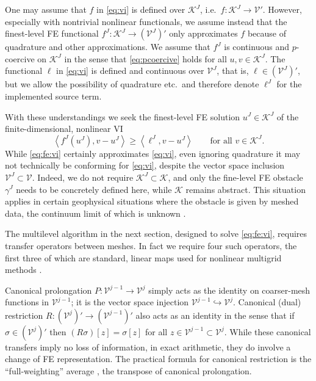 \documentclass[letterpaper,final,12pt,reqno]{amsart}
\theoremstyle{cstyle}
\theoremstyle{cstyle*}
\theoremstyle{dstyle}
\numberwithin{equation}{section}
\numberwithin{figure}{section}
\numberwithin{table}{section}
\numberwithin{theorem}{section}
\newcommand{\cK}{\mathcal{K}}
\newcommand{\ip}[2]{\left<#1,#2\right>}
\begin{document}
One may assume that $f$ in \eqref{eq:vi} is defined over $\mathcal{K}^J$, i.e.~$f:\mathcal{K}^J \to \mathcal{V}'$.  However, especially with nontrivial nonlinear functionals, we assume instead that the finest-level FE functional $f^J:\mathcal{K}^J \to (\mathcal{V}^J)'$ only approximates $f$ because of quadrature and other approximations.  We assume that $f^J$ is continuous and $p$-coercive on $\mathcal{K}^J$ in the sense that \eqref{eq:pcoercive} holds for all $u,v \in \mathcal{K}^J$.  The functional $\ell$ in \eqref{eq:vi} is defined and continuous over $\mathcal{V}^J$, that is, $\ell\in (\mathcal{V}^J)'$, but we allow the possibility of quadrature etc.~and therefore denote $\ell^J$ for the implemented source term.

With these understandings we seek the finest-level FE solution $u^J \in \mathcal{K}^J$ of the finite-dimensional, nonlinear VI
\begin{equation}
\ip{f^J(u^J)}{v-u^J} \ge \ip{\ell^J}{v-u^J} \qquad \text{for all } v\in \cK^J. \label{eq:fe:vi}
\end{equation}
While \eqref{eq:fe:vi} certainly approximates \eqref{eq:vi}, even ignoring quadrature it may not technically be conforming for \eqref{eq:vi}, despite the vector space inclusion $\mathcal{V}^J \subset \mathcal{V}$.  Indeed, we do not require $\mathcal{K}^J \subset \mathcal{K}$, and only the fine-level FE obstacle $\gamma^J$ needs to be concretely defined here, while $\mathcal{K}$ remains abstract.  This situation applies in certain geophysical situations where the obstacle is given by meshed data, the continuum limit of which is unknown \cite{Bueler2016}.

The multilevel algorithm in the next section, designed to solve \eqref{eq:fe:vi}, requires transfer operators between meshes.  In fact we require four such operators, the first three of which are standard, linear maps used for nonlinear multigrid methods \cite{Trottenbergetal2001}.

Canonical prolongation $P:\mathcal{V}^{j-1}\to\mathcal{V}^j$ simply acts as the identity on coarser-mesh functions in $\mathcal{V}^{j-1}$; it is the vector space injection $\mathcal{V}^{j-1} \hookrightarrow \mathcal{V}^j$.  Canonical (dual) restriction $R:(\mathcal{V}^j)'\to(\mathcal{V}^{j-1})'$ also acts as an identity in the sense that if $\sigma \in (\mathcal{V}^j)'$ then $(R\sigma)[z] = \sigma[z]$ for all $z \in \mathcal{V}^{j-1} \subset \mathcal{V}^j$.  While these canonical transfers imply no loss of information, in exact arithmetic, they do involve a change of FE representation.  The practical formula for canonical restriction is the ``full-weighting'' average \cite{Trottenbergetal2001}, the transpose of canonical prolongation.
\end{document}
